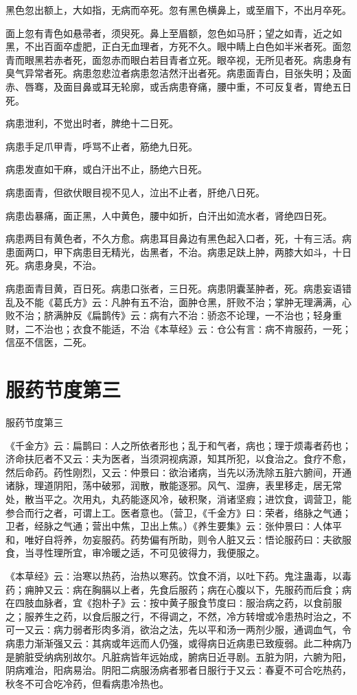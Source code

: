 \documentclass[a4paper,12pt,UTF8,twoside]{ctexbook}
\begin{document}
黑色忽出额上，大如指，无病而卒死。忽有黑色横鼻上，或至眉下，不出月卒死。

面上忽有青色如悬帚者，须臾死。鼻上至眉额，忽色如马肝；望之如青，近之如黑，不出百面卒虚肥，正白无血理者，方死不久。眼中睛上白色如半米者死。面忽青而眼黑若赤者死，面忽赤而眼白若目青者立死。眼卒视，无所见者死。病患身有臭气异常者死。病患忽悲泣者病患忽洁然汗出者死。病患面青白，目张失明；及面赤、唇骞，及面目鼻或耳无轮廓，或舌病患脊痛，腰中重，不可反复者，胃绝五日死。

病患泄利，不觉出时者，脾绝十二日死。

病患手足爪甲青，呼骂不止者，筋绝九日死。

病患发直如干麻，或白汗出不止，肠绝六日死。

病患面青，但欲伏眼目视不见人，泣出不止者，肝绝八日死。

病患齿暴痛，面正黑，人中黄色，腰中如折，白汗出如流水者，肾绝四日死。

病患两目有黄色者，不久方愈。病患耳目鼻边有黑色起入口者，死，十有三活。病患面两口，甲下病患目无精光，齿黑者，不治。病患足趺上肿，两膝大如斗，十日死。病患身臭，不治。

病患面青目黄，百日死。病患口张者，三日死。病患阴囊茎肿者，死。病患妄语错乱及不能《葛氏方》云∶凡肿有五不治，面肿仓黑，肝败不治；掌肿无理满满，心败不治；脐满肿反《扁鹊传》云∶病有六不治∶骄恣不论理，一不治也；轻身重财，二不治也；衣食不能适，不治《本草经》云∶仓公有言∶病不肯服药，一死；信巫不信医，二死。

\chapter{服药节度第三}

服药节度第三

《千金方》云∶扁鹊曰∶人之所依者形也；乱于和气者，病也；理于烦毒者药也；济命扶厄者不又云∶夫为医者，当须洞视病源，知其所犯，以食治之。食疗不愈，然后命药。药性刚烈，又云∶仲景曰∶欲治诸病，当先以汤洗除五脏六腑间，开通诸脉，理道阴阳，荡中破邪，润散，散能逐邪。风气、湿痹，表里移走，居无常处，散当平之。次用丸，丸药能逐风冷，破积聚，消诸坚瘕；进饮食，调营卫，能参合而行之者，可谓上工。医者意也。（营卫，《千金方》曰∶荣者，络脉之气通；卫者，经脉之气通；营出中焦，卫出上焦。）《养生要集》云∶张仲景曰∶人体平和，唯好自将养，勿妄服药。药势偏有所助，则令人脏又云∶悟论服药曰∶夫欲服食，当寻性理所宜，审冷暖之适，不可见彼得力，我便服之。

《本草经》云∶治寒以热药，治热以寒药。饮食不消，以吐下药。鬼注蛊毒，以毒药；痈肿又云∶病在胸膈以上者，先食后服药；病在心腹以下，先服药而后食；病在四肢血脉者，宜《抱朴子》云∶按中黄子服食节度曰∶服治病之药，以食前服之；服养生之药，以食后服之行，不得调之，不然，冷方转增或冷患热时治之，不可一又云∶病力弱者形肉多消，欲治之法，先以平和汤一两剂少服，通调血气，令病患力渐渐强又云∶其病或年远而人仍强，或得病日近病患已致瘦弱。此二种病乃是腑脏受纳病别故尔。凡脏病皆年远始成，腑病日近寻剧。五脏为阴，六腑为阳，阴病难治，阳病易治。阴阳二病服汤病者邪者日服行于又云∶春夏不可合吃热药，秋冬不可合吃冷药，但看病患冷热也。
\end{document}
